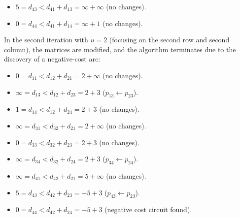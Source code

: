 \documentclass[12pt, a4paper]{report}
\begin{document}
\begin{example}
\begin{itemize}
            \item $5=d_{43} < d_{41} + d_{13} = \infty + \infty$ (no changes). 
            \item $0=d_{44} < d_{41} + d_{14} = \infty + 1$ (no changes). 
        \end{itemize}
        In the second iteration with $u=2$ (focusing on the second row and second column), the matrices are modified, and the algorithm terminates due to the discovery of a negative-cost arc:
        \begin{itemize}
            \item $0=d_{11} < d_{12} + d_{21} = 2 +\infty $ (no changes). 
            \item $\infty=d_{13} < d_{12} + d_{23} = 2+3$ ($p_{13} \leftarrow p_{23}$). 
            \item $1=d_{14} < d_{12} + d_{24} = 2+3$ (no changes). 
            \item $\infty=d_{31} < d_{32} + d_{21} = 2 + \infty$ (no changes). 
            \item $0=d_{33} < d_{32} + d_{23} = 2+3$ (no changes). 
            \item $\infty=d_{34} < d_{32} + d_{24} = 2+3$ ($p_{34} \leftarrow p_{24}$). 
            \item $\infty=d_{41} < d_{42} + d_{21} = 5 + \infty$ (no changes). 
            \item $5=d_{43} < d_{42} + d_{23} = -5+3$ ($p_{43} \leftarrow p_{23}$). 
            \item $0=d_{44} < d_{42} + d_{24} = -5+3$ (negative cost circuit found). 
        \end{itemize}
    \end{example}
\end{document}
